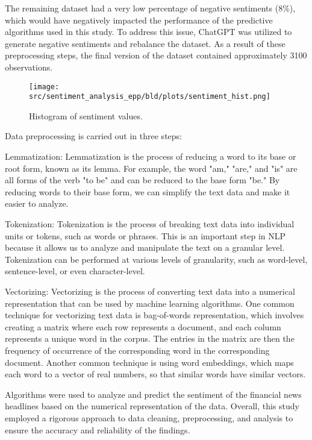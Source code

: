 \documentclass{article}
\begin{document}
The remaining dataset had a very low percentage of negative sentiments (8\%), which would have negatively impacted the performance of the predictive algorithms used in this study. To address this issue, ChatGPT was utilized to generate negative sentiments and rebalance the dataset. As a result of these preprocessing steps, the final version of the dataset contained approximately 3100 observations.


\begin{figure}[htbp]
  \centering
  \texttt{[image: src/sentiment\_analysis\_epp/bld/plots/sentiment\_hist.png]}
  \caption{Histogram of sentiment values.}
  \label{fig:sentiment_hist}
\end{figure}

Data preprocessing is carried out in three steps:

Lemmatization: Lemmatization is the process of reducing a word to its base or root form, known as its lemma. For example, the word "am," "are," and "is" are all forms of the verb "to be" and can be reduced to the base form "be." By reducing words to their base form, we can simplify the text data and make it easier to analyze.

Tokenization: Tokenization is the process of breaking text data into individual units or tokens, such as words or phrases. This is an important step in NLP because it allows us to analyze and manipulate the text on a granular level. Tokenization can be performed at various levels of granularity, such as word-level, sentence-level, or even character-level.

Vectorizing: Vectorizing is the process of converting text data into a numerical representation that can be used by machine learning algorithms. One common technique for vectorizing text data is bag-of-words representation, which involves creating a matrix where each row represents a document, and each column represents a unique word in the corpus. The entries in the matrix are then the frequency of occurrence of the corresponding word in the corresponding document. Another common technique is using word embeddings, which maps each word to a vector of real numbers, so that similar words have similar vectors.

Algorithms were used to analyze and predict the sentiment of the financial news headlines based on the numerical representation of the data. Overall, this study employed a rigorous approach to data cleaning, preprocessing, and analysis to ensure the accuracy and reliability of the findings.
\end{document}
